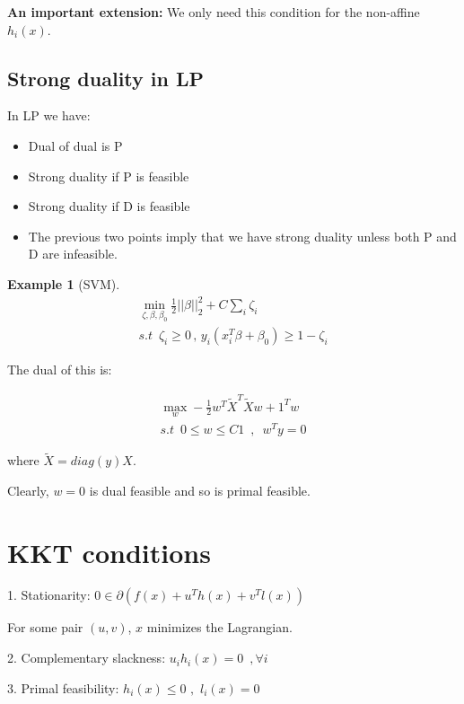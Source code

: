 \documentclass[10pt]{article}
\newtheorem{example}[ex]{Example}
\begin{document}
\textbf{An important extension:} We only need this condition for the non-affine $h_i(x)$.

\subsection{Strong duality in LP}
In LP we have:
\begin{itemize}
	\item Dual of dual is P
	\item Strong duality if P is feasible
	\item Strong duality if D is feasible
	\item The previous two points imply that we have strong duality unless both P and D are infeasible.  
\end{itemize}
 
\begin{example}[SVM] 
	\begin{equation}
	\begin{aligned}
		\min_{\zeta,\beta,\beta_0} \frac{1}{2} ||\beta||_2^2+C\sum_i \zeta_i\\
		s.t \,\,\, \zeta_i \ge 0 \, , \, y_i(x_i^T \beta + \beta_0) \ge 1-\zeta_i 
	\end{aligned}
	\end{equation}
\end{example} 

The dual of this is:

\begin{equation}
\begin{aligned}
	\max_w -\frac{1}{2} w^T\tilde{X}^T\tilde{X}w+1^Tw\\
	s.t \,\,\, 0 \le w \le C1 \,\,\, ,\,\,\, w^Ty=0
\end{aligned}
\end{equation}

\noindent where $\tilde{X}=diag(y)X$.

Clearly, $w=0$ is dual feasible and so is primal feasible.

\section{KKT conditions}
1. Stationarity:  $0 \in \partial(f(x)+u^Th(x)+v^Tl(x))$

	For some pair $(u,v)$, $x$ minimizes the Lagrangian. 

2. Complementary slackness: $u_ih_i(x)=0 \,\,\, , \forall i$

3. Primal feasibility: $h_i(x) \le 0 \,\,,\,\, l_i(x)=0$
\end{document}

